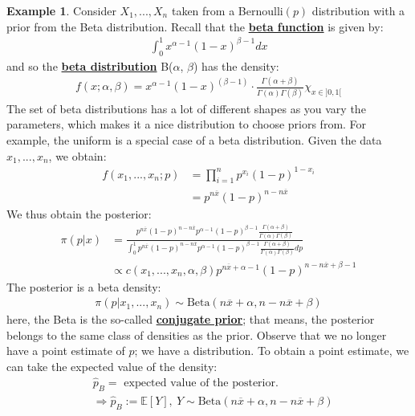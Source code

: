 \documentclass[11pt]{scrartcl}
\theoremstyle{definition}
\newtheorem{ex}{Example}
\theoremstyle{remark}
\newcommand{\dfn}[1]{\textbf{\underline{#1}}}
\newcommand{\EX}[1]{\mathbb{E}\left[#1 \right]}
\newcommand{\idx}[2]{\int_{#1}^{#2}}
\begin{document}
\begin{ex}
	Consider $X_1, ..., X_n$ taken from a Bernoulli$(p)$ distribution with a prior from the Beta distribution. Recall that the \dfn{beta function} is given by: 
	\begin{align*}
		\idx{0}{1} x^{\alpha -1} (1-x)^{\beta -1} dx 	
	\end{align*}
	and so the \dfn{beta distribution} B($\alpha$, $\beta$) has the density: 
	\begin{align}
		f(x; \alpha, \beta) = x^{\alpha - 1} (1-x)^{(\beta -1)} \cdot \frac{\Gamma (\alpha + \beta)}{\Gamma (\alpha) \Gamma (\beta)} \chi_{x \in ]0,1[}
	\end{align}
	The set of beta distributions has a lot of different shapes as you vary the parameters, which makes it a nice distribution to choose priors from. For example, the uniform is a special case of a beta distribution. Given the data $x_1, ..., x_n$, we obtain: 
	\begin{align*}
		f(x_1, ..., x_n; p) & = \prod_{i=1}^n p^{x_i}(1-p)^{1-x_i} 	\\
						    & = p^{n \overline{x}} (1-p)^{n - n \overline{x}} 
	\end{align*}
	We thus obtain the posterior: 
	\begin{align*}
		\pi (p | x ) & = \frac{p^{n \overline{x}} (1-p)^{n - n \overline{x}}  p^{\alpha -1} (1-p)^{\beta -1 } \frac{\Gamma (\alpha + \beta)}{\Gamma(\alpha) \Gamma(\beta)}}{\idx{0}{1}p^{n \overline{x}} (1-p)^{n - n \overline{x}}  p^{\alpha -1} (1-p)^{\beta -1 }  \frac{\Gamma (\alpha + \beta)}{\Gamma(\alpha) \Gamma(\beta)} dp }	\\
			& \propto c (x_1, ..., x_n, \alpha, \beta) p^{n \overline{x} + \alpha - 1} (1-p)^{n - n \overline{x} + \beta -1 } 
	\end{align*}
	The posterior is a beta density: 
	\begin{align*}
		\pi (p | x_1, ..., x_n) \sim \text{Beta}(n \overline{x} + \alpha, n - n \overline{x} + \beta) 	
	\end{align*}
	here, the Beta is the so-called \dfn{conjugate prior}; that means, the posterior belongs to the same class of densities as the prior. Observe that we no longer have a point estimate of $p$; we have a distribution. To obtain a point estimate, we can take the expected value of the density: 
	\begin{align*}
		& \hat{p}_B = \text{ expected value of the posterior. } 	\\
		& \Rightarrow \hat{p}_B := \EX{Y},\ Y \sim \text{Beta}(n \overline{x} + \alpha, n - n \overline{x} + \beta)

\end{align*}
\end{ex}
\end{document}
